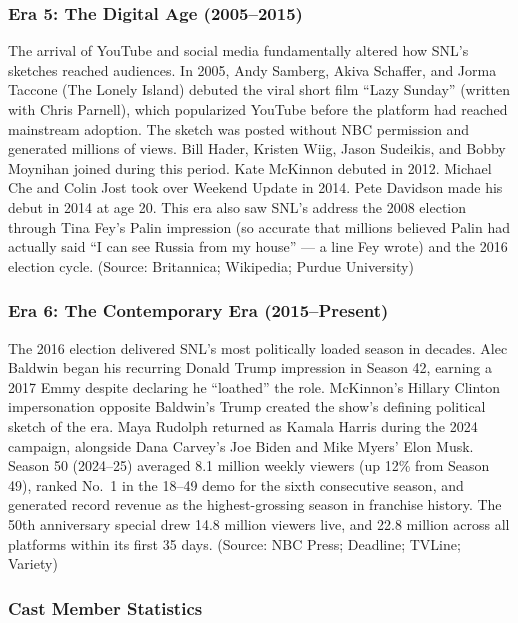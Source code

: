 \documentclass[11pt,letterpaper]{article}
\begin{document}
\subsubsection{Era 5: The Digital Age (2005--2015)}

The arrival of YouTube and social media fundamentally altered how SNL's sketches reached audiences. In 2005, Andy Samberg, Akiva Schaffer, and Jorma Taccone (The Lonely Island) debuted the viral short film ``Lazy Sunday'' (written with Chris Parnell), which popularized YouTube before the platform had reached mainstream adoption. The sketch was posted without NBC permission and generated millions of views. Bill Hader, Kristen Wiig, Jason Sudeikis, and Bobby Moynihan joined during this period. Kate McKinnon debuted in 2012. Michael Che and Colin Jost took over Weekend Update in 2014. Pete Davidson made his debut in 2014 at age 20. This era also saw SNL's address the 2008 election through Tina Fey's Palin impression (so accurate that millions believed Palin had actually said ``I can see Russia from my house'' --- a line Fey wrote) and the 2016 election cycle. (Source: Britannica; Wikipedia; Purdue University)

\subsubsection{Era 6: The Contemporary Era (2015--Present)}

The 2016 election delivered SNL's most politically loaded season in decades. Alec Baldwin began his recurring Donald Trump impression in Season 42, earning a 2017 Emmy despite declaring he ``loathed'' the role. McKinnon's Hillary Clinton impersonation opposite Baldwin's Trump created the show's defining political sketch of the era. Maya Rudolph returned as Kamala Harris during the 2024 campaign, alongside Dana Carvey's Joe Biden and Mike Myers' Elon Musk. Season 50 (2024--25) averaged 8.1 million weekly viewers (up 12\% from Season 49), ranked No.\ 1 in the 18--49 demo for the sixth consecutive season, and generated record revenue as the highest-grossing season in franchise history. The 50th anniversary special drew 14.8 million viewers live, and 22.8 million across all platforms within its first 35 days. (Source: NBC Press; Deadline; TVLine; Variety)

\subsubsection{Cast Member Statistics}
\end{document}
